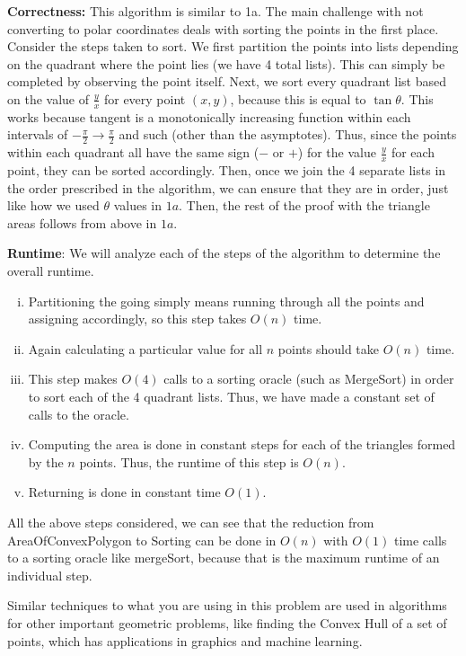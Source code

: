 \documentclass[11pt]{article}
\begin{document}
\begin{enumerate}
    \textbf{Correctness: } This algorithm is similar to 1a. The main challenge with not converting to polar coordinates deals with sorting the points in the first place. Consider the steps taken to sort. We first partition the points into lists depending on the quadrant where the point lies (we have 4 total lists). This can simply be completed by observing the point itself. Next, we sort every quadrant list based on the value of $\frac{y}{x}$ for every point $(x, y)$, because this is equal to $\tan \theta$. This works because tangent is a monotonically increasing function within each intervals of $-\frac{\pi}{2} \to \frac{\pi}{2}$ and such (other than the asymptotes). Thus, since the points within each quadrant all have the same sign ($-$ or $+$) for the value $\frac{y}{x}$ for each point, they can be sorted accordingly. Then, once we join the 4 separate lists in the order prescribed in the algorithm, we can ensure that they are in order, just like how we used $\theta$ values in $1a$. Then, the rest of the proof with the triangle areas follows from above in $1a$. 
    
    \textbf{Runtime}: We will analyze each of the steps of the algorithm to determine the overall runtime. 
    
    \begin{enumerate}[(i)]
        \item Partitioning the going simply means running through all the points and assigning accordingly, so this step takes $O(n)$ time.
        \item Again calculating a particular value for all $n$ points should take $O(n)$ time. 
        \item This step makes $O(4)$ calls to a sorting oracle (such as MergeSort) in order to sort each of the 4 quadrant lists. Thus, we have made a constant set of calls to the oracle.
        \item Computing the area is done in constant steps for each of the triangles formed by the $n$ points. Thus, the runtime of this step is $O(n)$. 
        \item Returning is done in constant time $O(1)$.
    \end{enumerate}
    
    All the above steps considered, we can see that the reduction from AreaOfConvexPolygon to Sorting can be done in $O(n)$ with $O(1)$ time calls to a sorting oracle like mergeSort, because that is the maximum runtime of an individual step. 
    
    
    Similar techniques to what you are using in this problem are used in algorithms for other important geometric problems, like finding the Convex Hull of a set of points, which has applications in graphics and machine learning.
    

\end{enumerate}
\end{document}
